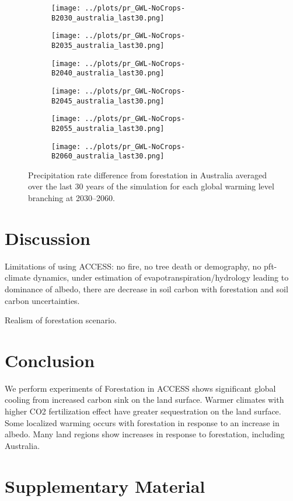 \documentclass[]{article}
\begin{document}
\begin{figure}[H]
    \centering
    \begin{subfigure}[b]{0.4\linewidth}
        \texttt{[image: ../plots/pr\_GWL-NoCrops-B2030\_australia\_last30.png]}
    \end{subfigure}
    \begin{subfigure}[b]{0.4\linewidth}
        \texttt{[image: ../plots/pr\_GWL-NoCrops-B2035\_australia\_last30.png]}
    \end{subfigure}
    \begin{subfigure}[b]{0.4\linewidth}
        \texttt{[image: ../plots/pr\_GWL-NoCrops-B2040\_australia\_last30.png]}
    \end{subfigure}
    \begin{subfigure}[b]{0.4\linewidth}
        \texttt{[image: ../plots/pr\_GWL-NoCrops-B2045\_australia\_last30.png]}
    \end{subfigure}
    \begin{subfigure}[b]{0.4\linewidth}
        \texttt{[image: ../plots/pr\_GWL-NoCrops-B2055\_australia\_last30.png]}
    \end{subfigure}
    \begin{subfigure}[b]{0.4\linewidth}
        \texttt{[image: ../plots/pr\_GWL-NoCrops-B2060\_australia\_last30.png]}
    \end{subfigure}
    \caption{Precipitation rate difference from forestation in Australia averaged over the last 30 years of the simulation for each global warming level branching at 2030–2060.}
    \label{fig:pr_australia}
\end{figure}

\section{Discussion}

Limitations of using ACCESS: no fire, no tree death or demography, no pft-climate dynamics, under estimation of evapotranspiration/hydrology leading to dominance of albedo, there are decrease in soil carbon with forestation and soil carbon uncertainties.

Realism of forestation scenario.

\section{Conclusion}

We perform experiments of 
Forestation in ACCESS shows significant global cooling from increased carbon sink on the land surface.
Warmer climates with higher CO2 fertilization effect have greater sequestration on the land surface.
Some localized warming occurs with forestation in response to an increase in albedo. 
Many land regions show increases in response to forestation, including Australia.

\printbibliography

\section{Supplementary Material}
\setcounter{figure}{0}
\end{document}
